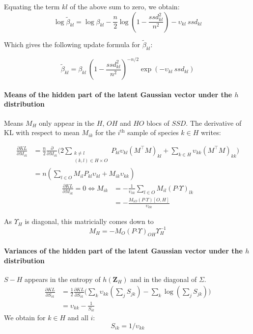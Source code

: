 \documentclass[11pt,a4paper]{article}
\newcommand{\Zbf}{\boldsymbol{Z}}
\newcommand{\had}{\boldsymbol{\cdot}}
\begin{document}
 
Equating the term $kl$ of the above sum to zero, we obtain:
 $$\log \widetilde{\beta}_{kl} = \log \beta_{kl} - \frac{n}{2} \log  \left(1-\frac{ssd_{kl}^2}{n^2}\right) - \upsilon_{kl}\:ssd_{kl} $$
 
Which gives the following update formula for $\widetilde{\beta}_{kl}$:
 
  $$\boxed{\displaystyle \widetilde{\beta}_{kl} = \beta_{kl} \: \left(1-\frac{ssd_{kl}^2}{n^2}\right)^{-n/2} \exp( -\upsilon_{kl}\: ssd_{kl} ) }$$


\paragraph{Means of the hidden part of the latent Gaussian vector under the $h$ distribution \\}
Means $M_H$ only appear in the $H$, $OH$ and $HO$ blocs of $SSD$. The derivative of KL with respect to mean $M_{ik}$ for the $i^\text{th}$ sample of species $k\in H$ writes:

\begin{align*}
\frac{\partial KL}{\partial M_{ik}} &=\frac{n}{2}\frac{\partial}{\partial M_{ik}}\Big(2\sum_{\substack{k \neq l\\
(k, l) \in H\times O}} P_{kl} \upsilon_{kl} (M^\intercal M)_{kl} + \sum_{k\in H} \upsilon_{kk} (M^\intercal M)_{kk}\Big)\\
&= n( \sum_{l \in O } M_{il} P_{kl}\upsilon_{kl} + M_{ik} \upsilon_{kk}) 
\end{align*}
\begin{align*}
\frac{\partial KL}{\partial M_{ik}}  = 0\iff M_{ik} &= -\frac{1}{\upsilon_{kk}} \sum_{l\in O} M_{il} (P\had\Upsilon)_{lk}\\
&=-\frac{M_{iO} (P\had\Upsilon)[O,H]}{\upsilon_{kk}}
\end{align*}

As $\Upsilon_H$ is diagonal, this  matricially comes down to
$$\boxed{ M_H = -M_O(P\had\Upsilon)_{OH} \Upsilon_H^{-1}}$$


\paragraph{Variances of the hidden part of the latent Gaussian vector under the $h$ distribution \\}
$S-H$ appears in the entropy of $h(\Zbf_H)$ and in the diagonal of $\Sigma$. 
\begin{align*}
\frac{\partial KL}{\partial S_{ik}} &= \frac{1}{2}  \frac{\partial KL}{\partial S_{ik}}  \Big(\sum_k \upsilon_{kk}(\sum_j S_{j k}) - \sum_k \log (\sum_jS_{j k})\Big)\\
&=\upsilon_{kk} - \frac{1}{S_{ik}}
\end{align*}
We obtain for $k\in H$ and all $i$:
$$\boxed{S_{ik} = 1/\upsilon_{kk}}$$
\end{document}
